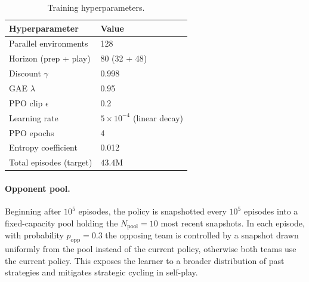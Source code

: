 \documentclass{article}
\begin{document}
\begin{table}[H]
  \centering
  \caption{Training hyperparameters.}
  \label{tab:hparams}
  \begin{tabular}{ll}
    \toprule
    Hyperparameter & Value \\
    \midrule
    Parallel environments      & 128 \\
    Horizon (prep + play)      & 80 (32 + 48) \\
    Discount $\gamma$          & 0.998 \\
    GAE $\lambda$              & 0.95 \\
    PPO clip $\epsilon$        & 0.2 \\
    Learning rate              & $5\times10^{-4}$ (linear decay) \\
    PPO epochs                 & 4 \\
    Entropy coefficient        & 0.012 \\
    Total episodes (target)    & $43.4$M \\
    \bottomrule
  \end{tabular}
\end{table}

\paragraph{Opponent pool.}
Beginning after $10^5$ episodes, the policy is snapshotted every $10^5$ episodes
into a fixed-capacity pool holding the $N_{\text{pool}}=10$ most recent
snapshots. In each episode, with probability $p_{\text{opp}}=0.3$ the opposing
team is controlled by a snapshot drawn uniformly from the pool instead of the
current policy, otherwise both teams use the current policy. This exposes the
learner to a broader distribution of past strategies and mitigates strategic
cycling in self-play.
\end{document}
